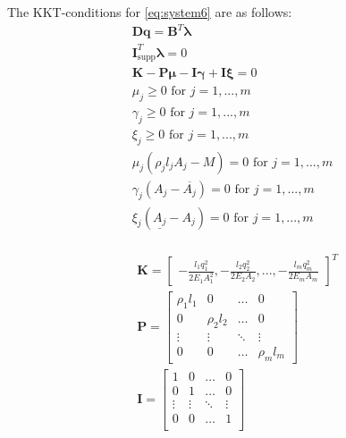 

The KKT-conditions for \eqref{eq:system6} are as follows:
\begin{equation}
\begin{aligned}
\bm{Dq} = \bm{B}^{T}\bm{\lambda}\\
\bm{I}^{T}_{\textrm{supp}}\bm{\lambda} = 0 \\
\bm{K} - \bm{P}\bm{\mu} - \bm{I}\bm{\gamma} + \bm{I}\bm{\xi} = 0 \\
\mu_j \geq 0  \text{ for } j = 1,...,m \\
\gamma_j \geq 0 \text{ for } j = 1,...,m \\
\xi_j \geq 0 \text{ for } j = 1,...,m \\
\mu_j(\rho_{j}l_{j}A_{j}-M) = 0 \text{ for } j = 1,...,m \\
\gamma_{j}(A_{j}-\overline{A_{j}}) = 0 \text{ for } j = 1,...,m \\
\xi_{j}(\underline{A_{j}}-A_{j}) = 0 \text{ for } j = 1,...,m \\
\end{aligned}
\end{equation}

\begin{align*}
&\bm{K} = \begin{bmatrix}
       -\frac{l_{1}q_{1}^2}{2E_{1}A_{1}^2}
       , -\frac{l_{2}q_{2}^2}{2E_{2}A_{2}}, ...,-\frac{l_{m}q_{m}^2}{2E_{m}A_{m}}
     \end{bmatrix}^T \\
&\bm{P} = \begin{bmatrix}
\rho_{1}l_{1} &  0  & \ldots & 0\\
0  &  \rho_{2}l_{2} & \ldots & 0\\
\vdots & \vdots & \ddots & \vdots\\
0  &   0       &\ldots & \rho_{m}l_{m}
\end{bmatrix}\\
&\bm{I} = \begin{bmatrix}
1 &  0  & \ldots & 0\\
0  &  1 & \ldots & 0\\
\vdots & \vdots & \ddots & \vdots\\
0  &   0  &\ldots & 1 \\
\end{bmatrix}
\end{align*}


